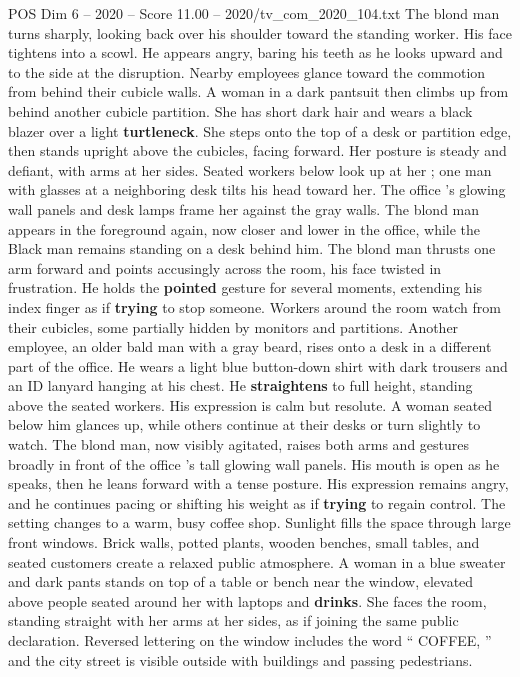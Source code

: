 \begin{textsample}{POS Dim 6 – 2020 – Score 11.00 – 2020/tv\_com\_2020\_104.txt}
The blond man turns sharply, looking back over his shoulder toward the standing worker.
His face tightens into a scowl.
He appears angry, baring his teeth as he looks upward and to the side at the disruption.
Nearby employees glance toward the commotion from behind their cubicle walls.
A woman in a dark pantsuit then climbs up from behind another cubicle partition.
She has short dark hair and wears a black blazer over a light \textbf{turtleneck}.
She steps onto the top of a desk or partition edge, then stands upright above the cubicles, facing forward.
Her posture is steady and defiant, with arms at her sides.
Seated workers below look up at her ; one man with glasses at a neighboring desk tilts his head toward her.
The office ’s glowing wall panels and desk lamps frame her against the gray walls.
The blond man appears in the foreground again, now closer and lower in the office, while the Black man remains standing on a desk behind him.
The blond man thrusts one arm forward and points accusingly across the room, his face twisted in frustration.
He holds the \textbf{pointed} gesture for several moments, extending his index finger as if \textbf{trying} to stop someone.
Workers around the room watch from their cubicles, some partially hidden by monitors and partitions.
Another employee, an older bald man with a gray beard, rises onto a desk in a different part of the office.
He wears a light blue button-down shirt with dark trousers and an ID lanyard hanging at his chest.
He \textbf{straightens} to full height, standing above the seated workers.
His expression is calm but resolute.
A woman seated below him glances up, while others continue at their desks or turn slightly to watch.
The blond man, now visibly agitated, raises both arms and gestures broadly in front of the office ’s tall glowing wall panels.
His mouth is open as he speaks, then he leans forward with a tense posture.
His expression remains angry, and he continues pacing or shifting his weight as if \textbf{trying} to regain control.
The setting changes to a warm, busy coffee shop.
Sunlight fills the space through large front windows.
Brick walls, potted plants, wooden benches, small tables, and seated customers create a relaxed public atmosphere.
A woman in a blue sweater and dark pants stands on top of a table or bench near the window, elevated above people seated around her with laptops and \textbf{drinks}.
She faces the room, standing straight with her arms at her sides, as if joining the same public declaration.
Reversed lettering on the window includes the word “ COFFEE, ” and the city street is visible outside with buildings and passing pedestrians.

\end{textsample}
